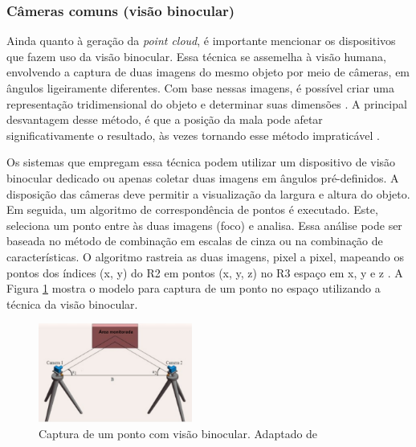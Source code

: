 \subsubsection{Câmeras comuns (visão binocular)}
\label{subsec_Cameras de visao binocular}

    Ainda quanto à geração da \textit{point cloud}, é importante mencionar os dispositivos que fazem uso da visão binocular. Essa técnica se assemelha à visão humana, envolvendo a captura de duas imagens do mesmo objeto por meio de câmeras, em ângulos ligeiramente diferentes. Com base nessas imagens, é possível criar uma representação tridimensional do objeto e determinar suas dimensões \cite{qingji_2018_method}. A principal desvantagem desse método, é que a posição da mala pode afetar significativamente o resultado, às vezes tornando esse método impraticável \cite{gao_2013_baggage}.

    Os sistemas que empregam essa técnica podem utilizar um dispositivo de visão binocular dedicado ou apenas coletar duas imagens em ângulos pré-definidos. A disposição das câmeras deve permitir a visualização da largura e altura do objeto. Em seguida, um algoritmo de correspondência de pontos é executado. Este, seleciona um ponto entre às duas imagens (foco) e analisa. Essa análise pode ser baseada no método de combinação em escalas de cinza ou na combinação de características. O algoritmo rastreia as duas imagens, pixel a pixel, mapeando os pontos dos índices (x, y) do R2 em pontos (x, y, z) no R3 espaço em x, y e z \cite{sun_2019_threedimensional, qingji_2018_method, li_2017_the}. A Figura \ref{fig:visao_binocular} mostra o modelo para captura de um ponto no espaço utilizando a técnica da visão binocular.

        \begin{figure}[h]
           \centering
           \includegraphics[width=0.45\textwidth]{imagens/capturaDeUmPontoComVisaoBinocular.png} 
           \caption{Captura de um ponto com visão binocular. Adaptado de \cite{hu_2020_accuracy}}
           \label{fig:visao_binocular}
        \end{figure}
    

